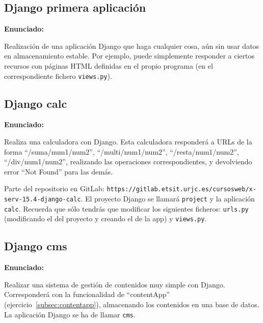\subsection{Django primera aplicación}
\label{subsec:django-primera}

\textbf{Enunciado:}

Realización de una aplicación Django que haga cualquier cosa, aún sin usar datos en almacenamiento estable. Por ejemplo, puede simplemente responder a ciertos recursos con páginas HTML definidas en el propio programa (en el correspondiente fichero \texttt{views.py}).

\subsection{Django calc}
\label{subsec:django-calc}

\textbf{Enunciado:}

Realiza una calculadora con Django. Esta calculadora responderá a URLs de la forma ``/suma/num1/num2'', ``/multi/num1/num2'', ``/resta/num1/num2'', ``/div/num1/num2'', realizando las operaciones correspondientes, y devolviendo error ``Not Found'' para las demás.

Parte del repositorio en GitLab: \verb|https://gitlab.etsit.urjc.es/cursosweb/x-serv-15.4-django-calc|. El proyecto Django se llamará \texttt{project} y la aplicación \texttt{calc}. 
Recuerda que sólo tendrás que modificar los siguientes ficheros: \texttt{urls.py} (modificando el del proyecto y creando el de la app) y \texttt{views.py}. 

%

\subsection{Django cms}
\label{subsec:django-cms}

\textbf{Enunciado:}

Realizar una sistema de gestión de contenidos muy simple con Django. Corresponderá con la funcionalidad de ``contentApp'' (ejercicio~\ref{subsec:contentapp}), almacenando los contenidos en una base de datos. La aplicación Django se ha de llamar \texttt{cms}.

